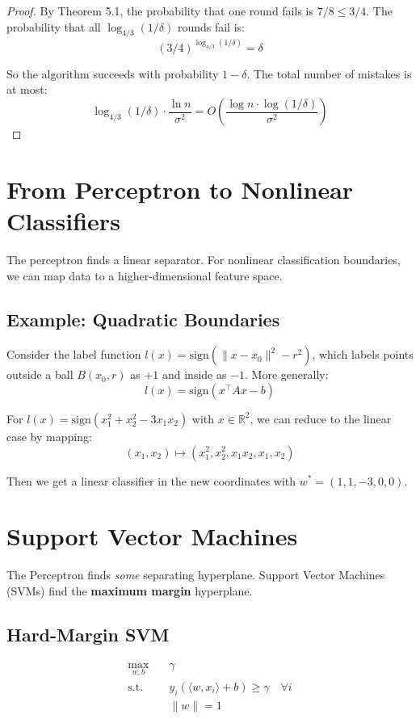 \documentclass[main.tex]{subfiles}
\begin{document}
\begin{proof}
By Theorem 5.1, the probability that one round fails is $7/8 \leq 3/4$. The probability that all $\log_{4/3}(1/\delta)$ rounds fail is:
$$(3/4)^{\log_{4/3}(1/\delta)} = \delta$$

So the algorithm succeeds with probability $1 - \delta$. The total number of mistakes is at most:
$$\log_{4/3}(1/\delta) \cdot \frac{\ln n}{\sigma^2} = O\left(\frac{\log n \cdot \log(1/\delta)}{\sigma^2}\right)$$
\end{proof}

\needspace{0.33\textheight}
\section{From Perceptron to Nonlinear Classifiers}

The perceptron finds a linear separator. For nonlinear classification boundaries, we can map data to a higher-dimensional feature space.

\subsection{Example: Quadratic Boundaries}

Consider the label function $l(x) = \text{sign}(\|x - x_0\|^2 - r^2)$, which labels points outside a ball $B(x_0, r)$ as $+1$ and inside as $-1$. More generally:
$$l(x) = \text{sign}(x^\top A x - b)$$

For $l(x) = \text{sign}(x_1^2 + x_2^2 - 3x_1 x_2)$ with $x \in \mathbb{R}^2$, we can reduce to the linear case by mapping:
$$(x_1, x_2) \mapsto (x_1^2, x_2^2, x_1 x_2, x_1, x_2)$$

Then we get a linear classifier in the new coordinates with $w^* = (1, 1, -3, 0, 0)$.

\needspace{0.33\textheight}
\section{Support Vector Machines}

The Perceptron finds \textit{some} separating hyperplane. Support Vector Machines (SVMs) find the \textbf{maximum margin} hyperplane.

\subsection{Hard-Margin SVM}

\begin{definition}
$$\begin{aligned}
\max_{w, b} \quad & \gamma \\
\text{s.t.} \quad & y_i(\langle w, x_i \rangle + b) \geq \gamma \quad \forall i \\
& \|w\| = 1
\end{aligned}$$
\end{definition}
\end{document}
